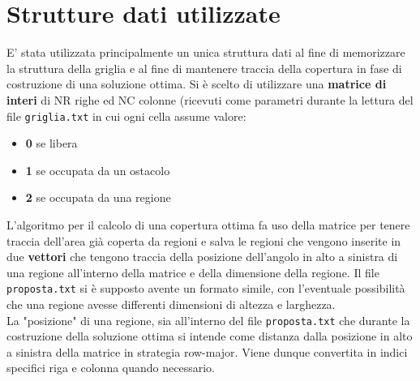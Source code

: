 \documentclass[11pt, a4paper, titlepage]{article}
\begin{document}
    \section{Strutture dati utilizzate}
        E' stata utilizzata principalmente un unica struttura dati al fine di memorizzare la struttura della griglia e al fine di
        mantenere traccia della copertura in fase di costruzione di una soluzione ottima. Si è scelto di utilizzare una \textbf{matrice di interi}
        di NR righe ed NC colonne (ricevuti come parametri durante la lettura del file \texttt{griglia.txt} in cui ogni cella assume valore:
        \begin{itemize}
            \item \textbf{0} se libera
            \item \textbf{1} se occupata da un ostacolo
            \item \textbf{2} se occupata da una regione\\
        \end{itemize}

        L'algoritmo per il calcolo di una copertura ottima fa uso della matrice per tenere traccia dell'area già coperta da regioni
        e salva le regioni che vengono inserite in due \textbf{vettori} che tengono traccia della posizione dell'angolo in alto a sinistra di una regione
        all'interno della matrice e della dimensione della regione. Il file \texttt{proposta.txt} si è supposto avente un formato simile, con l'eventuale
        possibilità che una regione avesse differenti dimensioni di altezza e larghezza.\\

        La "posizione" di una regione, sia all'interno del file \texttt{proposta.txt} che durante la costruzione della soluzione ottima si intende come distanza
        dalla posizione in alto a sinistra della matrice in strategia row-major. Viene dunque convertita in indici specifici riga e colonna quando necessario.
\end{document}
